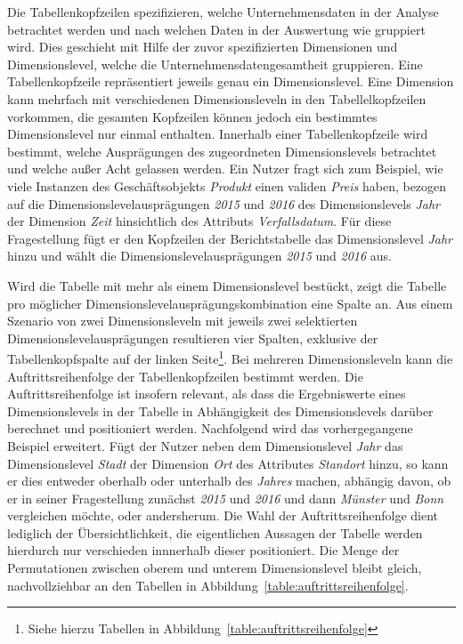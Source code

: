 \documentclass[
  language=german, %
  type=bachelor,%
  ngerman
]{isthesis}
\begin{document}
\begin{content}
  Die Tabellenkopfzeilen spezifizieren, welche Unternehmensdaten in der Analyse
  betrachtet werden und nach welchen Daten in der Auswertung wie gruppiert wird. Dies
  geschieht mit Hilfe der zuvor spezifizierten Dimensionen und Dimensionslevel,
  welche die Unternehmensdatengesamtheit gruppieren. Eine Tabellenkopfzeile
  repräsentiert jeweils genau ein Dimensionslevel. Eine Dimension kann mehrfach
  mit verschiedenen Dimensionsleveln in den Tabellelkopfzeilen vorkommen, die gesamten
  Kopfzeilen können jedoch ein bestimmtes Dimensionslevel nur einmal enthalten.
  Innerhalb einer Tabellenkopfzeile wird bestimmt, welche Ausprägungen des
  zugeordneten Dimensionslevels betrachtet und welche außer Acht gelassen
  werden. Ein Nutzer fragt sich zum Beispiel, wie viele Instanzen des
  Geschäftsobjekts \textit{Produkt} einen validen \textit{Preis} haben, bezogen
  auf die Dimensionslevelausprägungen \textit{2015} und \textit{2016} des
  Dimensionslevels \textit{Jahr} der Dimension \textit{Zeit} hinsichtlich des
  Attributs \textit{Verfallsdatum}. Für diese Fragestellung fügt er den
  Kopfzeilen der Berichtstabelle das Dimensionslevel \textit{Jahr} hinzu und
  wählt die Dimensionslevelausprägungen \textit{2015} und \textit{2016} aus.

  Wird die Tabelle mit mehr als einem Dimensionslevel bestückt, zeigt die
  Tabelle pro möglicher Dimensionslevelausprägungskombination eine Spalte an.
  Aus einem Szenario von zwei Dimensionsleveln mit jeweils zwei selektierten
  Dimensionslevelausprägungen resultieren vier Spalten, exklusive der
  Tabellenkopfspalte auf der linken Seite\footnote{Siehe hierzu Tabellen in
  Abbildung~\ref{table:auftrittsreihenfolge}}. Bei mehreren Dimensionsleveln
  kann die Auftrittsreihenfolge der Tabellenkopfzeilen bestimmt werden. Die
  Auftrittsreihenfolge ist insofern relevant, als dass die Ergebniswerte eines
  Dimensionslevels in der Tabelle in Abhängigkeit des Dimensionslevels darüber
  berechnet und positioniert werden. Nachfolgend wird das vorhergegangene
  Beispiel erweitert. Fügt der Nutzer neben dem Dimensionslevel \textit{Jahr}
  das Dimensionslevel \textit{Stadt} der Dimension \textit{Ort} des
  Attributes \textit{Standort} hinzu, so kann er dies entweder oberhalb oder
  unterhalb des \textit{Jahres} machen, abhängig davon, ob er in seiner
  Fragestellung zunächst \textit{2015} und \textit{2016} und dann \textit{Münster}
  und \textit{Bonn} vergleichen möchte, oder andersherum. Die Wahl der
  Auftrittsreihenfolge dient lediglich der Übersichtlichkeit, die eigentlichen
  Aussagen der Tabelle werden hierdurch nur verschieden innnerhalb dieser positioniert.
  Die Menge der Permutationen zwischen oberem und unterem Dimensionslevel
  bleibt gleich, nachvollziehbar an den Tabellen in
  Abbildung~\ref{table:auftrittsreihenfolge}.
  

\end{content}
\end{document}
